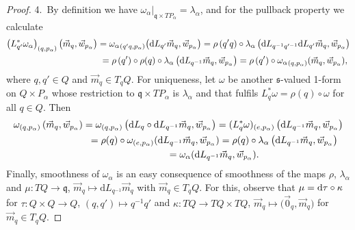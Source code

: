 \begin{proof}
4.~By def\/inition we have $\omega_\alpha|_{\mathfrak{q}\times TP_\alpha}=\lambda_\alpha$, and for the pullback property we
calculate
\begin{gather*}
\left(L_{q'}^{*}\omega_\alpha\right)_{(q,p_\alpha)}\big(\vec{m}_q,\vec{w}_{p_\alpha}\big)
={\omega_\alpha}_{(q'q,p_\alpha)}\big(\mathrm{d}
L_{q'}\vec{m}_q,\vec{w}_{p_\alpha}\big)
=\rho\left(q'q\right)\circ\lambda_\alpha\left(\mathrm{d} L_{q^{-1}q'^{-1}}\mathrm{d}
L_{q'}\vec{m}_q,\vec{w}_{p_\alpha}\right)
\\
\hphantom{\left(L_{q'}^{*}\omega_\alpha\right)_{(q,p_\alpha)}\big(\vec{m}_q,\vec{w}_{p_\alpha}\big)}{}
=\rho\left(q'\right)\circ\rho(q)\circ \lambda_\alpha\left(\mathrm{d}
L_{q^{-1}}\vec{m}_q,\vec{w}_{p_\alpha}\right)
=\rho\left(q'\right)\circ {\omega_\alpha}_{(q,p_\alpha)}(\vec{m}_q,\vec{w}_{p_\alpha}),
\end{gather*}
where $q,q'\in Q$ and $\vec{m}_q\in T_qQ$.
For uniqueness, let $\omega$ be another $\mathfrak{s}$-valued 1-form on $Q\times P_\alpha$ whose restriction to
$\mathfrak{q}\times TP_\alpha$ is $\lambda_\alpha$ and that fulf\/ils $L_q^{*}\omega=\rho(q)\circ \omega$ for all $q\in Q$.
Then
\begin{gather*}
\omega_{(q,p_\alpha)}\left(\vec{m}_q,\vec{w}_{p_\alpha}\right)={\omega}_{(q,p_\alpha)}\left(\mathrm{d} L_q\circ
\mathrm{d} L_{q^{-1}}\vec{m}_q,\vec{w}_{p_\alpha}\right) =(L_q^{*}\omega)_{(e,p_\alpha)}\left(\mathrm{d}
L_{q^{-1}}\vec{m}_q,\vec{w}_{p_\alpha}\right)
\\
\hphantom{\omega_{(q,p_\alpha)}\left(\vec{m}_q,\vec{w}_{p_\alpha}\right)}{}
=\rho(q)\circ \omega_{(e,p_\alpha)}(\mathrm{d} L_{q^{-1}}\vec{m}_q,\vec{w}_{p_\alpha}) = \rho(q)\circ
\lambda_\alpha\left(\mathrm{d} L_{q^{-1}}\vec{m}_q,\vec{w}_{p_\alpha}\right)
\\
\hphantom{\omega_{(q,p_\alpha)}\left(\vec{m}_q,\vec{w}_{p_\alpha}\right)}{}
=\omega_\alpha(\mathrm{d} L_{q^{-1}}\vec{m}_q,\vec{w}_{p_\alpha}).
\end{gather*}
Finally, smoothness of $\omega_\alpha$ is an easy consequence of smoothness of the maps $\rho$, $\lambda_\alpha$ and
$\mu \colon TQ\rightarrow \mathfrak{q}$, $\vec{m}_q \mapsto \mathrm{d} L_{q^{-1}}\vec{m}_q$ with $\vec{m}_q\in T_qQ$.
For this, observe that $\mu={\rm d}\tau \circ \kappa$ for $\tau\colon Q\times Q\rightarrow Q$, $(q,q')\mapsto q^{-1}q'$ and
$\kappa\colon TQ\rightarrow TQ\times TQ$, $\vec{m}_q\mapsto \big(\vec{0}_q,\vec{m}_q\big)$ for $\vec{m}_q\in T_qQ$.
\end{proof}

